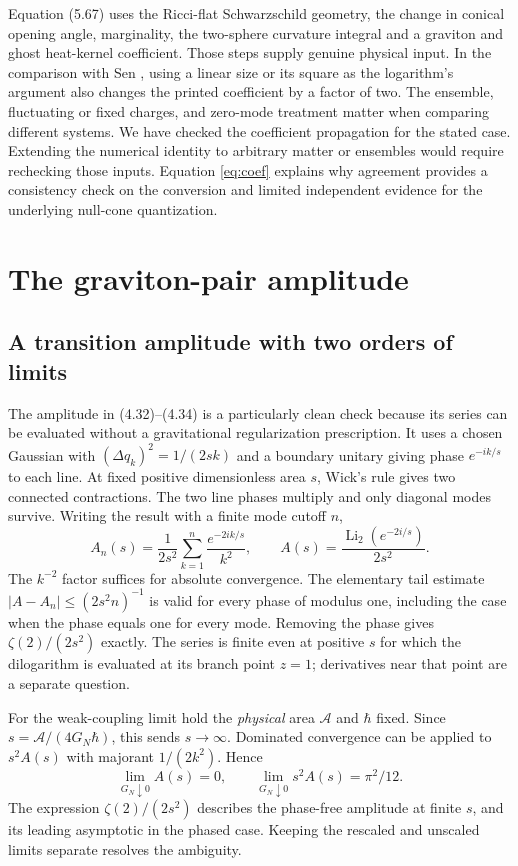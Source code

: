 \documentclass[11pt]{article}
\newcommand{\parttitle}[2]{\section{#1}}
\begin{document}
Equation (5.67) uses the Ricci-flat Schwarzschild geometry, the change in conical opening angle, marginality, the two-sphere curvature integral and a graviton and ghost heat-kernel coefficient. Those steps supply genuine physical input. In the comparison with Sen \cite{sen}, using a linear size or its square as the logarithm's argument also changes the printed coefficient by a factor of two. The ensemble, fluctuating or fixed charges, and zero-mode treatment matter when comparing different systems. We have checked the coefficient propagation for the stated case. Extending the numerical identity to arbitrary matter or ensembles would require rechecking those inputs. Equation \eqref{eq:coef} explains why agreement provides a consistency check on the conversion and limited independent evidence for the underlying null-cone quantization.

\parttitle{The graviton-pair amplitude}{The graviton-pair amplitude}
\subsection{A transition amplitude with two orders of limits}
The amplitude in (4.32)--(4.34) is a particularly clean check because its series can be evaluated without a gravitational regularization prescription. It uses a chosen Gaussian with $(\Delta q_k)^2=1/(2sk)$ and a boundary unitary giving phase $e^{-ik/s}$ to each line. At fixed positive dimensionless area $s$, Wick's rule gives two connected contractions. The two line phases multiply and only diagonal modes survive. Writing the result with a finite mode cutoff $n$,
\[
 A_n(s)=\frac1{2s^2}\sum_{k=1}^n \frac{e^{-2ik/s}}{k^2},\qquad
 A(s)=\frac{\operatorname{Li}_2(e^{-2i/s})}{2s^2}.
\]
The $k^{-2}$ factor suffices for absolute convergence. The elementary tail estimate $|A-A_n|\le(2s^2n)^{-1}$ is valid for every phase of modulus one, including the case when the phase equals one for every mode. Removing the phase gives $\zeta(2)/(2s^2)$ exactly. The series is finite even at positive $s$ for which the dilogarithm is evaluated at its branch point $z=1$; derivatives near that point are a separate question.

For the weak-coupling limit hold the \emph{physical} area $\mathcal A$ and $\hbar$ fixed. Since $s=\mathcal A/(4G_N\hbar)$, this sends $s\to\infty$. Dominated convergence can be applied to $s^2A(s)$ with majorant $1/(2k^2)$. Hence
\[
 \lim_{G_N\downarrow0} A(s)=0,\qquad
 \lim_{G_N\downarrow0}s^2 A(s)=\pi^2/12 .
\]
The expression $\zeta(2)/(2s^2)$ describes the phase-free amplitude at finite $s$, and its leading asymptotic in the phased case. Keeping the rescaled and unscaled limits separate resolves the ambiguity.
\end{document}
